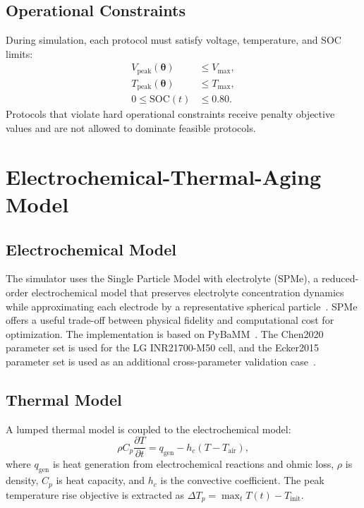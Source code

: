 \documentclass[journal]{IEEEtran}
\newcommand{\btheta}{\boldsymbol{\theta}}
\begin{document}
\subsection{Operational Constraints}

During simulation, each protocol must satisfy voltage, temperature, and SOC
limits:
\begin{align}
V_{\mathrm{peak}}(\btheta) &\leq V_{\max},\\
T_{\mathrm{peak}}(\btheta) &\leq T_{\max},\\
0 \leq \mathrm{SOC}(t) &\leq 0.80 .
\end{align}
Protocols that violate hard operational constraints receive penalty objective
values and are not allowed to dominate feasible protocols.

\section{Electrochemical-Thermal-Aging Model}
\label{sec:model}

\subsection{Electrochemical Model}

The simulator uses the Single Particle Model with electrolyte (SPMe), a
reduced-order electrochemical model that preserves electrolyte concentration
dynamics while approximating each electrode by a representative spherical
particle~\cite{ref6}. SPMe offers a useful trade-off between physical fidelity
and computational cost for optimization. The implementation is based on
PyBaMM~\cite{ref7}. The Chen2020 parameter set is used for the LG
INR21700-M50 cell, and the Ecker2015 parameter set is used as an additional
cross-parameter validation case~\cite{ref8,ref9}.

\subsection{Thermal Model}

A lumped thermal model is coupled to the electrochemical model:
\begin{equation}
\rho C_p \frac{\partial T}{\partial t}
=q_{\mathrm{gen}}-h_c(T-T_{\mathrm{air}}),
\label{eq:thermal}
\end{equation}
where $q_{\mathrm{gen}}$ is heat generation from electrochemical reactions and
ohmic loss, $\rho$ is density, $C_p$ is heat capacity, and $h_c$ is the
convective coefficient. The peak temperature rise objective is extracted as
$\Delta T_p=\max_t T(t)-T_{\mathrm{init}}$.
\end{document}
